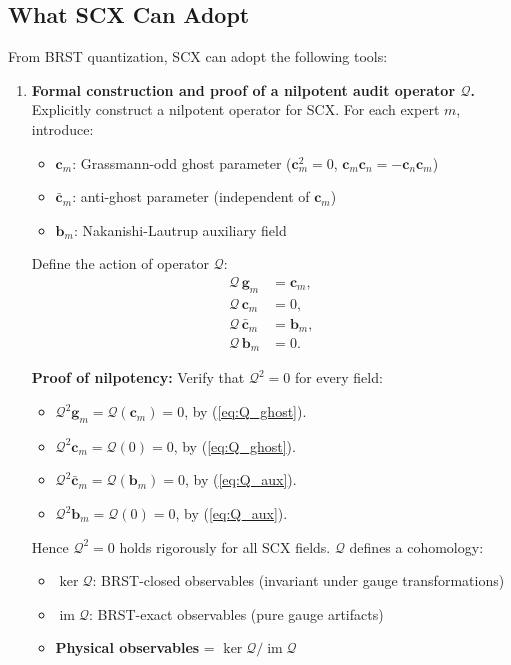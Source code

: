 \documentclass[12pt,a4paper]{article}
\theoremstyle{remark}
\newcommand{\gaugeparam}{\mathbf{g}}
\begin{document}
\subsection{What SCX Can Adopt}

From BRST quantization, SCX can adopt the following tools:

\begin{enumerate}[label=\textbf{(B\arabic*)}]
    \item \textbf{Formal construction and proof of a nilpotent audit operator $\mathcal{Q}$.}
    Explicitly construct a nilpotent operator for SCX. For each expert $m$, introduce:
    \begin{itemize}
        \item $\mathbf{c}_m$: Grassmann-odd ghost parameter ($\mathbf{c}_m^2 = 0$, $\mathbf{c}_m\mathbf{c}_n = -\mathbf{c}_n\mathbf{c}_m$)
        \item $\bar{\mathbf{c}}_m$: anti-ghost parameter (independent of $\mathbf{c}_m$)
        \item $\mathbf{b}_m$: Nakanishi-Lautrup auxiliary field
    \end{itemize}
    Define the action of operator $\mathcal{Q}$:
    \begin{align}
        \mathcal{Q}\,\gaugeparam_m &= \mathbf{c}_m, \label{eq:Q_gauge} \\
        \mathcal{Q}\,\mathbf{c}_m &= 0, \label{eq:Q_ghost} \\
        \mathcal{Q}\,\bar{\mathbf{c}}_m &= \mathbf{b}_m, \label{eq:Q_antighost} \\
        \mathcal{Q}\,\mathbf{b}_m &= 0. \label{eq:Q_aux}
    \end{align}

    \textbf{Proof of nilpotency:} Verify that $\mathcal{Q}^2 = 0$ for every field:
    \begin{itemize}
        \item $\mathcal{Q}^2\gaugeparam_m = \mathcal{Q}(\mathbf{c}_m) = 0$, by (\ref{eq:Q_ghost}).
        \item $\mathcal{Q}^2\mathbf{c}_m = \mathcal{Q}(0) = 0$, by (\ref{eq:Q_ghost}).
        \item $\mathcal{Q}^2\bar{\mathbf{c}}_m = \mathcal{Q}(\mathbf{b}_m) = 0$, by (\ref{eq:Q_aux}).
        \item $\mathcal{Q}^2\mathbf{b}_m = \mathcal{Q}(0) = 0$, by (\ref{eq:Q_aux}).
    \end{itemize}
    Hence $\mathcal{Q}^2 = 0$ holds rigorously for all SCX fields. $\mathcal{Q}$ defines a cohomology:
    \begin{itemize}
        \item $\ker\mathcal{Q}$: BRST-closed observables (invariant under gauge transformations)
        \item $\operatorname{im}\mathcal{Q}$: BRST-exact observables (pure gauge artifacts)
        \item \textbf{Physical observables} = $\ker\mathcal{Q} / \operatorname{im}\mathcal{Q}$
    \end{itemize}


\end{enumerate}
\end{document}
